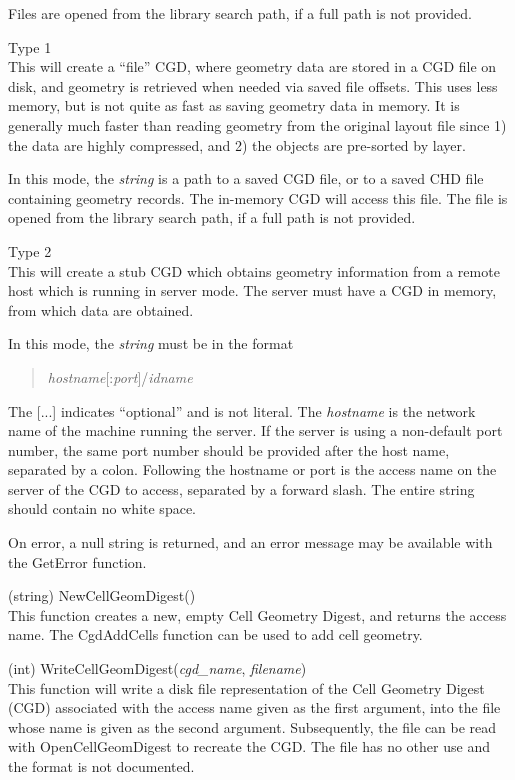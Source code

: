 \begin{description}
\begin{description}
Files are opened from the library search path, if a full path is
not provided.

\item{Type 1}\\
This will create a ``file'' CGD, where geometry data are stored in a
CGD file on disk, and geometry is retrieved when needed via saved
file offsets.  This uses less memory, but is not quite as fast as
saving geometry data in memory.  It is generally much faster than
reading geometry from the original layout file since 1) the data
are highly compressed, and 2) the objects are pre-sorted by layer.

In this mode, the {\it string} is a path to a saved CGD file, or to a
saved CHD file containing geometry records.  The in-memory CGD will
access this file.  The file is opened from the library search path, if
a full path is not provided.

\item{Type 2}\\
This will create a stub CGD which obtains geometry information from a
remote host which is running {\Xic} in server mode.  The server must
have a CGD in memory, from which data are obtained.

In this mode, the {\it string} must be in the format
\begin{quote}
{\it hostname\/}[{\vt :}{\it port\/}]{\vt /}{\it idname}
\end{quote}

The [...] indicates ``optional'' and is not literal.  The
{\it hostname} is the network name of the machine running the server. 
If the server is using a non-default port number, the same port number
should be provided after the host name, separated by a colon. 
Following the hostname or port is the access name on the server of the
CGD to access, separated by a forward slash.  The entire string should
contain no white space.
\end{description}

On error, a null string is returned, and an error message may be
available with the {\vt GetError} function.

\item{(string) \vt NewCellGeomDigest()}\\
This function creates a new, empty Cell Geometry Digest, and returns
the access name.  The {\vt CgdAddCells} function can be used to add
cell geometry.

\item{(int) \vt WriteCellGeomDigest({\it cgd\_name\/}, {\it filename\/})}\\
This function will write a disk file representation of the Cell
Geometry Digest (CGD) associated with the access name given as the
first argument, into the file whose name is given as the second
argument.  Subsequently, the file can be read with {\vt
OpenCellGeomDigest} to recreate the CGD.  The file has no other
use and the format is not documented.


\end{description}
